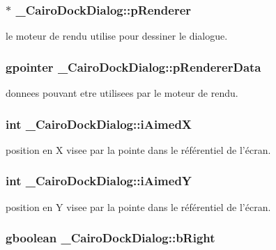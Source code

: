\subsubsection{$\ast$ {\bf \_\-CairoDockDialog::pRenderer}}\label{struct__CairoDockDialog_736d9d146b94f6c2d4ecef66e533dd1a}


le moteur de rendu utilise pour dessiner le dialogue. 

\subsubsection{\setlength{\rightskip}{0pt plus 5cm}gpointer {\bf \_\-CairoDockDialog::pRendererData}}\label{struct__CairoDockDialog_1f649d95c2ca4f6bd18c4b9cf87a6851}


donnees pouvant etre utilisees par le moteur de rendu. 

\subsubsection{\setlength{\rightskip}{0pt plus 5cm}int {\bf \_\-CairoDockDialog::iAimedX}}\label{struct__CairoDockDialog_be262824938a38d1ee2a22aa1669f97a}


position en X visee par la pointe dans le référentiel de l'écran. 

\subsubsection{\setlength{\rightskip}{0pt plus 5cm}int {\bf \_\-CairoDockDialog::iAimedY}}\label{struct__CairoDockDialog_2ee4d046788740222018a37db15d9589}


position en Y visee par la pointe dans le référentiel de l'écran. 

\subsubsection{\setlength{\rightskip}{0pt plus 5cm}gboolean {\bf \_\-CairoDockDialog::bRight}}\label{struct__CairoDockDialog_cb17f2c9935774992dbf64861a1fad75}


